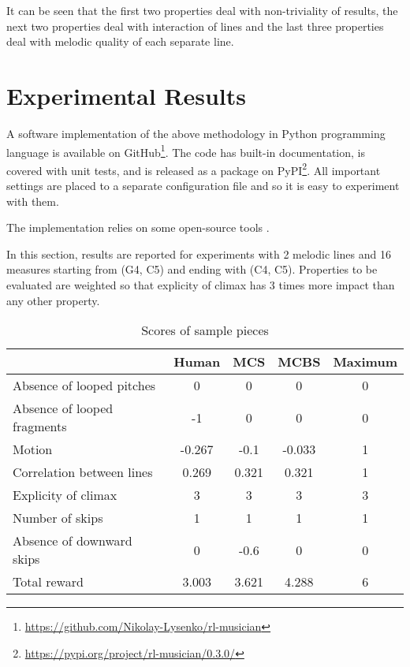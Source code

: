 \documentclass{article}
\begin{document}
It can be seen that the first two properties deal with non-triviality of results, the next two properties deal with interaction of lines and the last three properties deal with melodic quality of each separate line. 


\section{Experimental Results}
\label{sec:results}

A software implementation of the above methodology in Python programming language is available on GitHub\footnote{\url{https://github.com/Nikolay-Lysenko/rl-musician}}. The code has built-in documentation, is covered with unit tests, and is released as a package on PyPI\footnote{\url{https://pypi.org/project/rl-musician/0.3.0/}}. All important settings are placed to a separate configuration file and so it is easy to experiment with them.

The implementation relies on some open-source tools \cite{brockman2016openai,oliphant2006guide,raffel2014intuitive}.

In this section, results are reported for experiments with 2 melodic lines and 16 measures starting from (G4, C5) and ending with (C4, C5). Properties to be evaluated are weighted so that explicity of climax has 3 times more impact than any other property.

\begin{table}[h!]
	\caption{Scores of sample pieces}
	\label{table:scores}
	\begin{center}
		\begin{tabular}{|l|c|c|c|c|}
			\hline
			& Human & MCS & MCBS & Maximum\\
			\hline
			Absence of looped pitches & 0 & 0 & 0 & 0\\
			\hline
			Absence of looped fragments & -1 & 0 & 0 & 0\\
			\hline
			Motion & -0.267 & -0.1 & -0.033 & 1\\
			\hline
			Correlation between lines & 0.269 & 0.321 & 0.321 & 1\\
			\hline
			Explicity of climax & 3 & 3 & 3 & 3\\
			\hline
			Number of skips & 1 & 1 & 1 & 1\\
			\hline
			Absence of downward skips & 0 & -0.6 & 0 & 0\\
			\hline
			Total reward & 3.003 & 3.621 & 4.288 & 6\\
			\hline
		\end{tabular}
	\end{center}
\end{table}
\end{document}
